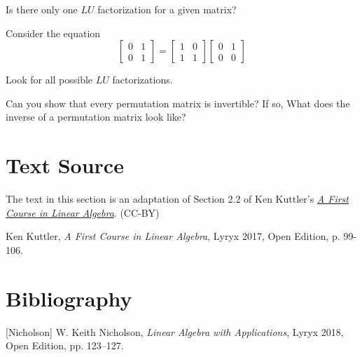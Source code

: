 \documentclass{ximera}
\begin{document}
\begin{problem}\label{prob:LU4}
Is there only one $LU$ factorization for a given matrix?

\begin{hint}Consider the equation
$$
\begin{bmatrix}0 & 1 \\0 & 1\end{bmatrix}=\begin{bmatrix}1& 0 \\1 & 1\end{bmatrix} \begin{bmatrix}0 & 1 \\0 & 0\end{bmatrix}
$$

Look for all possible $LU$ factorizations.
\end{hint}
\end{problem}

\begin{problem}\label{prob:LU5}
Can you show that every permutation matrix is invertible?  If so, What does the inverse of a permutation matrix look like?
\end{problem}

\section*{Text Source}
The text in this section is an adaptation of Section 2.2 of Ken Kuttler's \href{https://open.umn.edu/opentextbooks/textbooks/a-first-course-in-linear-algebra-2017}{\it A First Course in Linear Algebra}. (CC-BY)

Ken Kuttler, {\it  A First Course in Linear Algebra}, Lyryx 2017, Open Edition, p. 99-106.

\section*{Bibliography}

[Nicholson] W. Keith Nicholson, {\it Linear Algebra with Applications}, Lyryx 2018, Open Edition, pp. 123--127.
\end{document}
